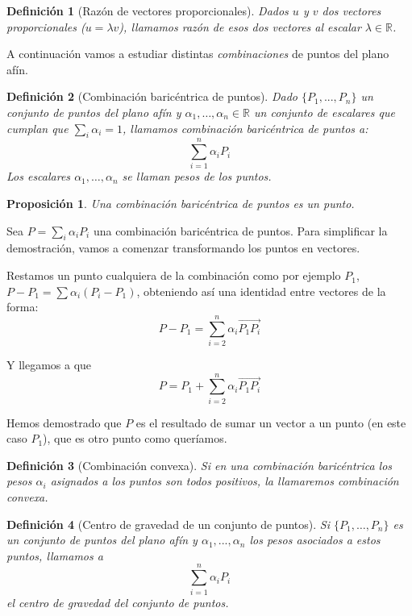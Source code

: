 \documentclass[11pt, a4paper]{article}
\makeatletter
\newif\IfInSansMode
\let\oldsf\sffamily
\renewcommand*{\sffamily}{\oldsf\mathversion{sans}\InSansModetrue}
\let\oldnorm\normalfont
\renewcommand*{\normalfont}{\oldnorm\InSansModefalse\mathversion{normal}}
\renewenvironment{proof}[1][\proofname] {\vspace{-15pt}\par\pushQED{\qed}\normalfont\topsep6\p@\@plus6\p@\relax\trivlist\item[\hskip\labelsep\it#1\@addpunct{.}]\ignorespaces}{\popQED\endtrivlist\@endpefalse}
\newcommand{\R}{\mathbb{R}}
\renewenvironment{proof}[1][\proofname] {\par\pushQED{\qed}\normalfont\topsep6\p@\@plus6\p@\relax\trivlist\item[\hskip\labelsep\itshape\sffamily#1\@addpunct{.}]\ignorespaces}{\popQED\endtrivlist\@endpefalse}
\theoremstyle{theorem-style}
\newtheorem{nprop}{Proposición}[section]
\theoremstyle{definition-style}
\newtheorem{ndef}{Definición}[section]
\theoremstyle{remark-style}
\theoremstyle{example-style}
\makeatother
\begin{document}
\begin{ndef}[Razón de vectores proporcionales]
  Dados $u$ y $v$ dos vectores proporcionales ($u = \lambda v$), llamamos \textit{razón} de esos dos vectores al escalar $\lambda \in \R$.
\end{ndef}

A continuación vamos a estudiar distintas \textit{combinaciones} de puntos del plano afín.

\begin{ndef}[Combinación baricéntrica de puntos]
  Dado $\{P_1,...,P_n\}$ un conjunto de puntos del plano afín y $\alpha_1,\dots,\alpha_n \in \R$ un conjunto de escalares que cumplan que $\sum_i \alpha_i = 1$, llamamos \textit{combinación baricéntrica de puntos} a:
  \[
    \sum_{i=1}^n \alpha_i P_i
  \]
  Los escalares $\alpha_1,\dots,\alpha_n$ se llaman \textit{pesos} de los puntos.
\end{ndef}

\begin{nprop} Una combinación baricéntrica de puntos es un punto. 
\end{nprop}

\begin{proof}

  Sea $P = \sum_i \alpha_i P_i$ una combinación baricéntrica de puntos. Para simplificar la demostración, vamos a comenzar transformando los puntos en vectores.

  Restamos un punto cualquiera de la combinación como por ejemplo $P_1$, $P-P_1 = \sum \alpha_i(P_i-P_1)$, obteniendo así una identidad entre vectores de la forma:
  \[
    P-P_1 = \sum_{i=2}^n \alpha_i \overrightarrow{P_1P_i}
  \]

  Y llegamos a que
  \[
    P = P_1 + \sum_{i=2}^n \alpha_i \overrightarrow{P_1P_i}
  \]
  
  Hemos demostrado que $P$ es el resultado de sumar un vector a un punto (en este caso $P_1$), que es otro punto como queríamos.
\end{proof}

\begin{ndef}[Combinación convexa]
  Si en una combinación baricéntrica los pesos $\alpha_i$ asignados a los puntos son todos positivos, la llamaremos \textit{combinación convexa}. \end{ndef}

\begin{ndef}[Centro de gravedad de un conjunto de puntos]
  Si $\{P_1,\dots,P_n\}$ es un conjunto de puntos del plano afín y $\alpha_1,...,\alpha_n$ los \textit{pesos} asociados a estos puntos, llamamos a
  \[
    \sum_{i=1}^n \alpha_iP_i
  \]
  el \textit{centro de gravedad del conjunto de puntos}.
\end{ndef}
\end{document}
